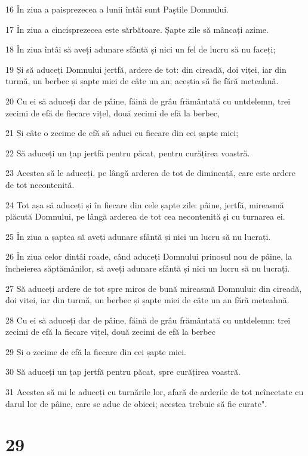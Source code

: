\par 16 În ziua a paisprezecea a lunii întâi sunt Paștile Domnului.
\par 17 În ziua a cincisprezecea este sărbătoare. Șapte zile să mâncați azime.
\par 18 În ziua întâi să aveți adunare sfântă și nici un fel de lucru să nu faceți;
\par 19 Și să aduceți Domnului jertfă, ardere de tot: din cireadă, doi viței, iar din turmă, un berbec și șapte miei de câte un an; aceștia să fie fără meteahnă.
\par 20 Cu ei să aduceți dar de pâine, făină de grâu frământată cu untdelemn, trei zecimi de efă de fiecare vițel, două zecimi de efă la berbec,
\par 21 Și câte o zecime de efă să aduci cu fiecare din cei șapte miei;
\par 22 Să aduceți un țap jertfă pentru păcat, pentru curățirea voastră.
\par 23 Acestea să le aduceți, pe lângă arderea de tot de dimineață, care este ardere de tot necontenită.
\par 24 Tot așa să aduceți și în fiecare din cele șapte zile: pâine, jertfă, mireasmă plăcută Domnului, pe lângă arderea de tot cea necontenită și cu turnarea ei.
\par 25 În ziua a șaptea să aveți adunare sfântă și nici un lucru să nu lucrați.
\par 26 În ziua celor dintâi roade, când aduceți Domnului prinosul nou de pâine, la încheierea săptămânilor, să aveți adunare sfântă și nici un lucru să nu lucrați.
\par 27 Să aduceți ardere de tot spre miros de bună mireasmă Domnului: din cireadă, doi vitei, iar din turmă, un berbec și șapte miei de câte un an fără meteahnă.
\par 28 Cu ei să aduceți dar de pâine, făină de grâu frământată cu untdelemn: trei zecimi de efă la fiecare vițel, două zecimi de efă la berbec
\par 29 Și o zecime de efă la fiecare din cei șapte miei.
\par 30 Să aduceți un țap jertfă pentru păcat, spre curățirea voastră.
\par 31 Acestea să mi le aduceți cu turnările lor, afară de arderile de tot neîncetate cu darul lor de pâine, care se aduc de obicei; acestea trebuie să fie curate".

\chapter{29}

